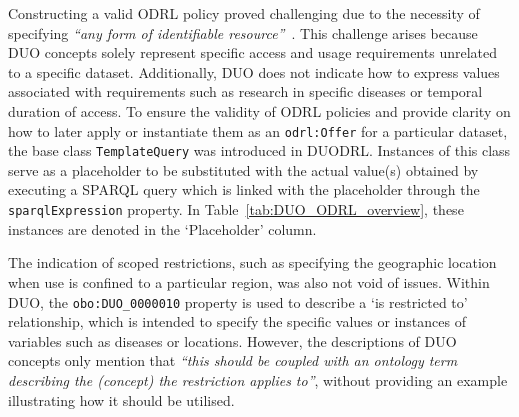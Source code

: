 Constructing a valid ODRL policy proved challenging due to the necessity of specifying \textit{``any form of identifiable resource''}~\citep{iannella_odrl_vocab_2018}.
This challenge arises because DUO concepts solely represent specific access and usage requirements unrelated to a specific dataset.
Additionally, DUO does not indicate how to express values associated with requirements such as research in specific diseases or temporal duration of access.
To ensure the validity of ODRL policies and provide clarity on how to later apply or instantiate them as an \texttt{odrl:Offer} for a particular dataset, the base class \texttt{TemplateQuery} was introduced in DUODRL.
Instances of this class serve as a placeholder to be substituted with the actual value(s) obtained by executing a SPARQL query which is linked with the placeholder through the \texttt{sparqlExpression} property.
In Table~\ref{tab:DUO_ODRL_overview}, these instances are denoted in the `Placeholder' column.

The indication of scoped restrictions, such as specifying the geographic location when use is confined to a particular region, was also not void of issues.
Within DUO, the \texttt{obo:DUO\_0000010} property is used to describe a `is restricted to' relationship, which is intended to specify the specific values or instances of variables such as diseases or locations.
However, the descriptions of DUO concepts only mention that \textit{``this should be coupled with an ontology term describing the (concept) the restriction applies to''}, without providing an example illustrating how it should be utilised.

